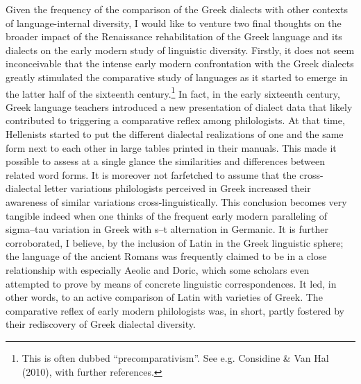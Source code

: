 \documentclass[12pt]{article}
\newenvironment{styleStandard}{\renewcommand\baselinestretch{1.25}\setlength\leftskip{0in}\setlength\rightskip{0in}\setlength\parindent{0.1972in}\setlength\parfillskip{0pt plus 1fil}\setlength\parskip{0in plus 1pt}\writerlistparindent\writerlistleftskip\leavevmode\normalfont\normalsize\writerlistlabel\ignorespaces}{\unskip\vspace{0in plus 1pt}\par}
\newcommand\writerlistleftskip{}
\newcommand\writerlistparindent{}
\newcommand\writerlistlabel{}
\begin{document}
\begin{styleStandard}
Given the frequency of the comparison of the Greek dialects with other contexts of language-internal diversity, I would like to venture two final thoughts on the broader impact of the Renaissance rehabilitation of the Greek language and its dialects on the early modern study of linguistic diversity. Firstly, it does not seem inconceivable that the intense early modern confrontation with the Greek dialects greatly stimulated the comparative study of languages as it started to emerge in the latter half of the sixteenth century.\footnote{ This is often dubbed “precomparativism”. See e.g. Considine \& Van Hal (2010), with further references.} In fact, in the early sixteenth century, Greek language teachers introduced a new presentation of dialect data that likely contributed to triggering a comparative reflex among philologists. At that time, Hellenists started to put the different dialectal realizations of one and the same form next to each other in large tables printed in their manuals. This made it possible to assess at a single glance the similarities and differences between related word forms. It is moreover not farfetched to assume that the cross-dialectal letter variations philologists perceived in Greek increased their awareness of similar variations cross-linguistically. This conclusion becomes very tangible indeed when one thinks of the frequent early modern paralleling of sigma–tau variation in Greek with s–t alternation in Germanic. It is further corroborated, I believe, by the inclusion of Latin in the Greek linguistic sphere; the language of the ancient Romans was frequently claimed to be in a close relationship with especially Aeolic and Doric, which some scholars even attempted to prove by means of concrete linguistic correspondences. It led, in other words, to an active comparison of Latin with varieties of Greek. The comparative reflex of early modern philologists was, in short, partly fostered by their rediscovery of Greek dialectal diversity.
\end{styleStandard}
\end{document}

